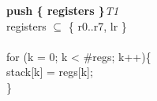


\begin{instructionblock}{\imagewidth}%
    \textbf{push \{ registers \}}\hfill\textit{T1}\\
    registers $\subseteq$ \{ r0..r7, lr \}\\
    {}\\
    for (k = 0; k < \#regs; k++)\{\\
    stack[k] = regs[k];\\
    \}
\end{instructionblock}

